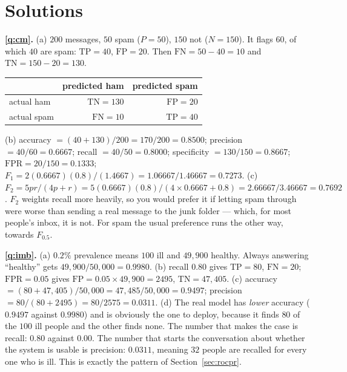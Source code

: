 \documentclass[11pt]{article}
\newcommand{\TP}{\mathrm{TP}}
\newcommand{\FP}{\mathrm{FP}}
\newcommand{\TN}{\mathrm{TN}}
\newcommand{\FN}{\mathrm{FN}}
\newcommand{\FPR}{\mathrm{FPR}}
\begin{document}
\section{Solutions}
\label{sec:solutions}

\textbf{\ref{q:cm}.} (a) $200$ messages, $50$ spam ($P = 50$), $150$ not
($N = 150$). It flags $60$, of which $40$ are spam: $\TP = 40$, $\FP = 20$.
Then $\FN = 50 - 40 = 10$ and $\TN = 150 - 20 = 130$.
\begin{center}\small
\begin{tabular}{@{}lrr@{}}
\toprule
 & predicted ham & predicted spam\\
\midrule
actual ham  & $\TN = 130$ & $\FP = 20$\\
actual spam & $\FN = 10$  & $\TP = 40$\\
\bottomrule
\end{tabular}
\end{center}
(b) accuracy $= (40 + 130)/200 = 170/200 = 0.8500$;
precision $= 40/60 = 0.6667$;
recall $= 40/50 = 0.8000$;
specificity $= 130/150 = 0.8667$;
$\FPR = 20/150 = 0.1333$;
$F_1 = 2(0.6667)(0.8)/(1.4667) = 1.06667/1.46667 = 0.7273$.
(c) $F_2 = 5 pr/(4p + r) = 5(0.6667)(0.8)/(4 \times 0.6667 + 0.8)
= 2.66667/3.46667 = 0.7692$. $F_2$ weights recall more heavily, so you would
prefer it if letting spam through were worse than sending a real message to the
junk folder --- which, for most people's inbox, it is not. For spam the usual
preference runs the other way, towards $F_{0.5}$.

\medskip
\textbf{\ref{q:imb}.} (a) $0.2\%$ prevalence means $100$ ill and $49{,}900$
healthy. Always answering ``healthy'' gets $49{,}900/50{,}000 = \mathbf{0.9980}$.
(b) recall $0.80$ gives $\TP = 80$, $\FN = 20$; $\FPR = 0.05$ gives
$\FP = 0.05 \times 49{,}900 = 2495$, $\TN = 47{,}405$.
(c) accuracy $= (80 + 47{,}405)/50{,}000 = 47{,}485/50{,}000 = \mathbf{0.9497}$;
precision $= 80/(80 + 2495) = 80/2575 = \mathbf{0.0311}$.
(d) The real model has \emph{lower} accuracy ($0.9497$ against $0.9980$) and is
obviously the one to deploy, because it finds $80$ of the $100$ ill people and
the other finds none. The number that makes the case is recall: $0.80$ against
$0.00$. The number that starts the conversation about whether the system is
usable is precision: $0.0311$, meaning $32$ people are recalled for every one who
is ill. This is exactly the pattern of Section~\ref{sec:rocpr}.
\end{document}
